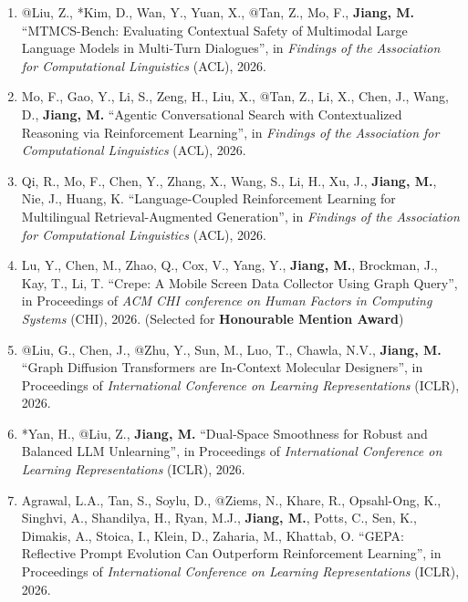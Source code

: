 \documentclass[10pt]{article}
\newenvironment{myindentpar}[1]%
{\begin{list}{}%
         {\setlength{\leftmargin}{#1}}%
         \item[]%
}
{\end{list}}
\newcounter{list}
\begin{document}
\begin{myindentpar}{0.00cm}
\begin{enumerate}[leftmargin=.5cm]
\item[C132] @Liu, Z., *Kim, D., Wan, Y., Yuan, X., @Tan, Z., Mo, F., \textbf{Jiang, M.} ``MTMCS-Bench: Evaluating Contextual Safety of Multimodal Large Language Models in Multi-Turn Dialogues'', in \textit{Findings of the Association for Computational Linguistics} (ACL), 2026.

\item[C131] Mo, F., Gao, Y., Li, S., Zeng, H., Liu, X., @Tan, Z., Li, X., Chen, J., Wang, D., \textbf{Jiang, M.} ``Agentic Conversational Search with Contextualized Reasoning via Reinforcement Learning'', in \textit{Findings of the Association for Computational Linguistics} (ACL), 2026.

\item[C130] Qi, R., Mo, F., Chen, Y., Zhang, X., Wang, S., Li, H., Xu, J., \textbf{Jiang, M.}, Nie, J., Huang, K. ``Language-Coupled Reinforcement Learning for Multilingual Retrieval-Augmented Generation'', in \textit{Findings of the Association for Computational Linguistics} (ACL), 2026.

\item[C129] Lu, Y., Chen, M., Zhao, Q., Cox, V., Yang, Y., \textbf{Jiang, M.}, Brockman, J., Kay, T., Li, T. ``Crepe: A Mobile Screen Data Collector Using Graph Query'', in Proceedings of \textit{ACM CHI conference on Human Factors in Computing Systems} (CHI), 2026. (Selected for \textbf{Honourable Mention Award})

\item[C128] @Liu, G., Chen, J., @Zhu, Y., Sun, M., Luo, T., Chawla, N.V., \textbf{Jiang, M.} ``Graph Diffusion Transformers are In-Context Molecular Designers'', in Proceedings of \textit{International Conference on Learning Representations} (ICLR), 2026.

\item[C127] *Yan, H., @Liu, Z., \textbf{Jiang, M.} ``Dual-Space Smoothness for Robust and Balanced LLM Unlearning'', in Proceedings of \textit{International Conference on Learning Representations} (ICLR), 2026.

\item[C126] Agrawal, L.A., Tan, S., Soylu, D., @Ziems, N., Khare, R., Opsahl-Ong, K., Singhvi, A., Shandilya, H., Ryan, M.J., \textbf{Jiang, M.}, Potts, C., Sen, K., Dimakis, A., Stoica, I., Klein, D., Zaharia, M., Khattab, O. ``GEPA: Reflective Prompt Evolution Can Outperform Reinforcement Learning'', in Proceedings of \textit{International Conference on Learning Representations} (ICLR), 2026.


\end{enumerate}
\end{myindentpar}
\end{document}
